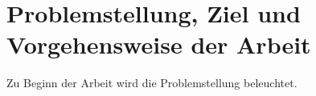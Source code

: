 
\section{Problemstellung, Ziel und Vorgehensweise der Arbeit}
\label{sec:problemstellung}

Zu Beginn der Arbeit wird die Problemstellung beleuchtet.